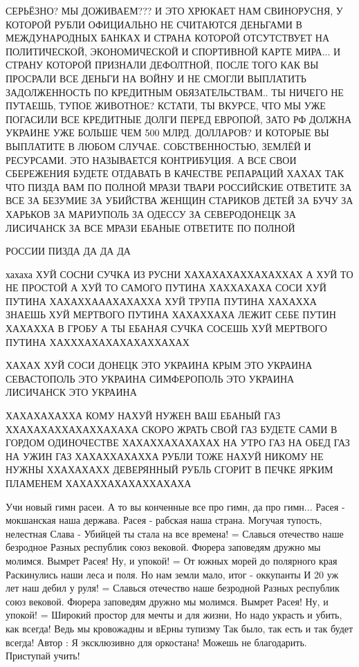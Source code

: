 СЕРЬЁЗНО? МЫ ДОЖИВАЕМ??? И ЭТО ХРЮКАЕТ НАМ СВИНОРУСНЯ, У КОТОРОЙ РУБЛИ
ОФИЦИАЛЬНО НЕ СЧИТАЮТСЯ ДЕНЬГАМИ В МЕЖДУНАРОДНЫХ БАНКАХ И СТРАНА КОТОРОЙ
ОТСУТСТВУЕТ НА ПОЛИТИЧЕСКОЙ, ЭКОНОМИЧЕСКОЙ И СПОРТИВНОЙ КАРТЕ МИРА... И СТРАНУ
КОТОРОЙ ПРИЗНАЛИ ДЕФОЛТНОЙ, ПОСЛЕ ТОГО КАК ВЫ ПРОСРАЛИ ВСЕ ДЕНЬГИ НА ВОЙНУ И НЕ
СМОГЛИ ВЫПЛАТИТЬ ЗАДОЛЖЕННОСТЬ ПО КРЕДИТНЫМ ОБЯЗАТЕЛЬСТВАМ.. ТЫ НИЧЕГО НЕ
ПУТАЕШЬ, ТУПОЕ ЖИВОТНОЕ? КСТАТИ, ТЫ ВКУРСЕ, ЧТО МЫ УЖЕ ПОГАСИЛИ ВСЕ КРЕДИТНЫЕ
ДОЛГИ ПЕРЕД ЕВРОПОЙ, ЗАТО РФ ДОЛЖНА УКРАИНЕ УЖЕ БОЛЬШЕ ЧЕМ 500 МЛРД. ДОЛЛАРОВ?
И КОТОРЫЕ ВЫ ВЫПЛАТИТЕ В ЛЮБОМ СЛУЧАЕ. СОБСТВЕННОСТЬЮ, ЗЕМЛЁЙ И РЕСУРСАМИ. ЭТО
НАЗЫВАЕТСЯ КОНТРИБУЦИЯ. А ВСЕ СВОИ СБЕРЕЖЕНИЯ БУДЕТЕ ОТДАВАТЬ В КАЧЕСТВЕ
РЕПАРАЦИЙ ХАХАХ ТАК ЧТО ПИЗДА ВАМ ПО ПОЛНОЙ МРАЗИ ТВАРИ РОССИЙСКИЕ ОТВЕТИТЕ ЗА ВСЕ
ЗА БЕЗУМИЕ ЗА УБИЙСТВА ЖЕНЩИН СТАРИКОВ ДЕТЕЙ ЗА БУЧУ ЗА ХАРЬКОВ ЗА МАРИУПОЛЬ
ЗА ОДЕССУ ЗА СЕВЕРОДОНЕЦК ЗА ЛИСИЧАНСК ЗА ВСЕ МРАЗИ ЕБАНЫЕ ОТВЕТИТЕ ПО ПОЛНОЙ

РОССИИ ПИЗДА ДА ДА ДА

хахаха ХУЙ СОСНИ СУЧКА ИЗ РУСНИ ХАХАХАХАХХАХАХХАХ А ХУЙ ТО НЕ ПРОСТОЙ А ХУЙ ТО
САМОГО ПУТИНА ХАХХАХАХА СОСИ ХУЙ ПУТИНА ХАХАХХАААХАХАХХА ХУЙ ТРУПА ПУТИНА
ХАХАХХА ЗНАЕШЬ ХУЙ МЕРТВОГО ПУТИНА ХАХАХХАХА ЛЕЖИТ СЕБЕ ПУТИН ХАХАХХА В ГРОБУ А
ТЫ ЕБАНАЯ СУЧКА СОСЕШЬ ХУЙ МЕРТВОГО ПУТИНА ХАХХХАХАХАХАХАХХАХАХ 

ХАХАХ ХУЙ СОСИ ДОНЕЦК ЭТО УКРАИНА КРЫМ ЭТО УКРАИНА СЕВАСТОПОЛЬ ЭТО УКРАИНА
СИМФЕРОПОЛЬ ЭТО УКРАИНА ЛИСИЧАНСК ЭТО УКРАИНА

ХАХАХАХАХХА КОМУ НАХУЙ НУЖЕН ВАШ ЕБАНЫЙ ГАЗ ХХАХАХАХХАХАХХАХАХА СКОРО ЖРАТЬ
СВОЙ ГАЗ БУДЕТЕ САМИ В ГОРДОМ ОДИНОЧЕСТВЕ ХАХАХХАХАХАХАХ НА УТРО ГАЗ НА ОБЕД
ГАЗ НА УЖИН ГАЗ ХАХАХХАХАХХА РУБЛИ ТОЖЕ НАХУЙ НИКОМУ НЕ НУЖНЫ ХХАХАХАХХ
ДЕВЕРЯННЫЙ РУБЛЬ СГОРИТ В ПЕЧКЕ ЯРКИМ ПЛАМЕНЕМ ХАХАХХАХАХАХХАХАХА


Учи новый гимн расеи.
А то вы конченные все про гимн, да про гимн...
Расея - мокшанская наша держава.
Расея - рабская наша страна.
Могучая тупость, нелестная Слава -
Убийцей ты стала на все времена!
=
Славься отечество наше безродное
Разных республик союз вековой.
Фюрера заповедям дружно мы молимся.
Вымрет Расея! Ну, и упокой!
=
От южных морей до полярного края
Раскинулись наши леса и поля.
Но нам земли мало, итог - оккупанты
И 20 уж лет наш дебил у руля!
=
Славься отечество наше безродной
Разных республик союз вековой.
Фюрера заповедям дружно мы молимся.
Вымрет Расея! Ну, и упокой!
=
Широкий простор для мечты и для жизни,
Но надо украсть и убить, как всегда!
Ведь мы кровожадны и вЕрны тупизму
Так было, так есть и так будет всегда!
Автор : Я эксклюзивно для оркостана!
Можешь не благодарить.
Приступай учить!

